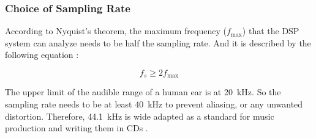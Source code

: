 \subsubsection{Choice of Sampling Rate}

According to Nyquist's theorem, the maximum frequency ($f_{\text{max}}$) that the DSP system can analyze needs to be 
half the sampling rate. And it is described by the following equation \cite{siemens_dsp_sampling}:

\begin{equation}
    f_s \geq 2 f_{\text{max}}
\end{equation}

The upper limit of the audible range of a human ear is at \SI{20}{\kilo \hertz}. So the sampling rate
needs to be at least \SI{40}{\kilo \hertz} to prevent aliasing, or any unwanted distortion. Therefore,
\SI{44.1}{\kilo \hertz} is wide adapted as a standard for music production and writing them in 
CDs \cite{lisacademy2026digitalaudio}.